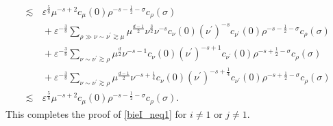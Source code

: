 \documentclass[11pt,letterpaper,reqno]{amsart}
\numberwithin{equation}{section}
\theoremstyle{definition}
\theoremstyle{remark}
\begin{document}
\begin{align*}
\lesssim &\, \varepsilon^{\frac58}\mu^{-s+2} c_\mu(0) \rho^{-s-\frac 12 -\sigma} c_\rho(\sigma)\\
&\,+\varepsilon^{-\frac 38} \sum_{\rho \gg \nu \sim \nu^\prime \gtrsim \mu}  \mu^{\frac{d-1}2} \nu^{\frac 32} \nu^{-s} c_\nu( 0)  (\nu^\prime)^{-s} c_{\nu^\prime}(0) \rho^{-s-\frac 12 -\sigma} c_\rho(\sigma) \\
&\, +\varepsilon^{-\frac 38}\sum_{  \nu \sim \nu^\prime \gtrsim \rho} \mu^{\frac{d}{2}}  \nu^{-s-1} c_{\nu }(0) (\nu^\prime)^{-s+1} c_{\nu^\prime }(0)  \rho^{-s+\frac 12-\sigma} c_{\rho} (\sigma)\\
&\, +\varepsilon^{-\frac 38}\sum_{  \nu \sim \nu^\prime \gtrsim \rho} \mu^{\frac{d-1}{2}}  \nu^{-s+\frac 14} c_{\nu }(0) (\nu^\prime)^{-s+\frac 14} c_{\nu^\prime }(0)  \rho^{-s+\frac 12-\sigma} c_{\rho} (\sigma)\\
\lesssim &\, \varepsilon^{\frac58}\mu^{-s+2} c_\mu(0) \rho^{-s-\frac 12 -\sigma} c_\rho(\sigma).
   \end{align*}
 This completes the proof  of \eqref{bieI_neq1} for \(i\neq 1\) or \(j\neq 1\).
\end{document}
